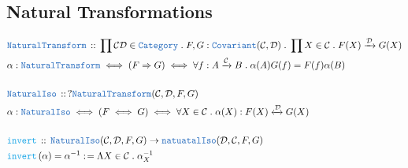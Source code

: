 \documentclass[12pt]{scrartcl}
\newcommand{\TYPE}[1]{\textcolor{NavyBlue}{\mathtt{#1}}}
\newcommand{\FUNC}[1]{\textcolor{Cerulean}{\mathtt{#1}}}
\renewcommand{\.}{\; . \;}
\newcommand{\de}{: \kern 0.1pc =}
\newcommand{\Act}[1]{\left( #1 \right)}
\newcommand{\DeclareType}[2]{& \TYPE{#1} \, :: \, #2 \\}
\newcommand{\DefineNamedType}[4]{& #1 : \TYPE{#2} \iff #3 \iff #4 \\}
\newcommand{\DeclareFunc}[2]{& \FUNC{#1} \, :: \, #2 \\}
\newcommand{\DefineNamedFunc}[4]{&  \FUNC{#1}\Act{#2} = #3 \de #4 \\}
\newcommand{\Page}[1]{ \begin{align*} #1 \end{align*}   }
\newcommand{\Cat}{\TYPE{Category}}
\newcommand{\ToIso}{\xleftrightarrow}
\newcommand{\Arrow}{\xrightarrow}
\newcommand{\Cov}{\TYPE{Covariant}}
\newcommand{\NT}{\TYPE{NaturalTransform}}
\newcommand{\C}{\mathcal{C}}
\begin{document}
\subsection{Natural Transformations}
\Page{
	\DeclareType{NaturalTransform}{\prod \C \mathcal{D} \in \Cat \.  F,G : \Cov(\C,\mathcal{D}) \. 
		 \prod X \in \C \. F(X) \Arrow{\mathcal{D}} G(X) }
	\DefineNamedType{ \alpha }{NaturalTransform}{(F \Rightarrow G)}{\forall f : A \Arrow{\C} B\. \alpha(A)G(f) = F(f)\alpha(B)  }
	\\
	\DeclareType{NaturalIso}{ ?\NT(\C,\mathcal{D},F,G)}
	\DefineNamedType{\alpha}{NaturalIso}{(F \iff G)}{\forall X \in \C \. \alpha(X) : F(X) \ToIso{\mathcal{D}} G(X)}
	\\
	\DeclareFunc{invert}{\TYPE{NaturalIso}(\C,\mathcal{D},F,G) \to \TYPE{natuatalIso}(\mathcal{D},\C,F,G)}
	\DefineNamedFunc{invert}{\alpha}{\alpha^{-1}}{\Lambda X \in \C \. \alpha_X^{-1}}
}
\newpage
\end{document}
